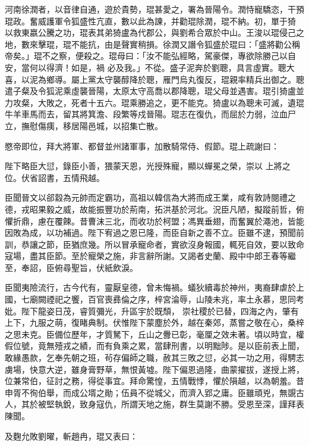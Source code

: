 \begin{pinyinscope}
 河南徐潤者，以音律自通，遊於貴勢，琨甚愛之，署為晉陽令。潤恃寵驕恣，干預琨政。奮威護軍令狐盛性亢直，數以此為諫，并勸琨除潤，琨不納。初，單于猗以救東嬴公騰之功，琨表其弟猗盧為代郡公，與劉希合眾於中山。王浚以琨侵己之地，數來擊琨，琨不能抗，由是聲實稍損。徐潤又譖令狐盛於琨曰：「盛將勸公稱帝矣。」琨不之察，便殺之。琨母曰：「汝不能弘經略，駕豪傑，專欲除勝己以自安，當何以得濟！如是，禍
 必及我。」不從。盛子泥奔於劉聰，具言虛實。聰大喜，以泥為鄉導。屬上黨太守襲醇降於聰，雁門烏丸復反，琨親率精兵出御之。聰遣子粲及令狐泥乘虛襲晉陽，太原太守高喬以郡降聰，琨父母並遇害。琨引猗盧並力攻粲，大敗之，死者十五六。琨乘勝追之，更不能克。猗盧以為聰未可滅，遺琨牛羊車馬而去，留其將箕澹、段繁等戍晉陽。琨志在復仇，而屈於力弱，泣血尸立，撫慰傷痍，移居陽邑城，以招集亡散。



 愍帝即位，拜大將軍、都督並州諸軍事，加散騎常侍、假節。琨上疏謝曰：



 陛下略臣大愆，錄臣小善，猥蒙天恩，光授殊寵，顯以蟬冕之榮，崇以
 上將之位。伏省詔書，五情飛越。



 臣聞晉文以郤縠為元帥而定霸功，高祖以韓信為大將而成王業，咸有敦詩閱禮之德，戎昭果毅之威，故能振豐功於荊南，拓洪基於河北。況臣凡陋，擬蹤前哲，俯懼折鼎，慮在覆餗。昔曹沫三北，而收功於柯盟；馮異垂翅，而奮翼於澠池，皆能因敗為成，以功補過。陛下宥過之恩已隆，而臣自新之善不立。臣雖不逮，預聞前訓，恭讓之節，臣猶庶幾。所以冒承寵命者，實欲沒身報國，輒死自效，要以致命寇場，盡其臣節。至於寵榮之施，非言辭所謝。又謁者史蘭、殿中中郎王春等繼至，奉詔，臣俯尋聖旨，伏紙飲淚。



 臣聞夷險流行，古今代有，靈厭皇德，曾未悔禍。蟻狄續毒於神州，夷裔肆虐於上國，七廟闕禋祀之饗，百官喪彞倫之序，梓宮淪辱，山陵未兆，率土永慕，思同考妣。陛下龍姿日茂，睿質彌光，升區宇於既頹，
 崇社稷於已替，四海之內，肇有上下，九服之萌，復睹典制。伏惟陛下蒙塵於外，越在秦郊，蒸嘗之敬在心，桑梓之思未克。臣備位歷年，才質駑下，丘山之釁已彰，毫厘之效未著。頃以時宜，權假位號，竟無殪戎之績，而有負乘之累，當肆刑書，以明黜陟。是以臣前表上聞，敢緣愚款，乞奉先朝之班，茍存偏師之職，赦其三敗之愆，必其一功之用，得騁志虜場，快意大逆，雖身膏野草，無恨黃墟。陛下偏恩過隆，曲蒙擢拔，遂授上將，位兼常伯，征討之務，得從事宜。拜命驚惶，五情戰悸，懼於隕越，以為朝羞。昔申胥不徇伯舉，而成公壻之勛；伍員不從城父，而濟入郢之庸。臣雖頑兇，無覬古人，其於被堅執銳，致身寇仇，所謂天地之施，群生莫謝不勝。受恩至深，謹拜表陳聞。



 及麴允敗劉曜，斬趙冉，琨又表曰：




\end{pinyinscope}
